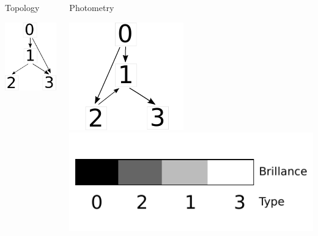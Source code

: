 \begin{frame}
\begin{columns}[c]
			\column{10em}	
				\begin{exampleblock}{Topology}
					\begin{center}
						\includegraphics[trim= 0mm 0mm 0mm 0mm, clip, height=0.6\textwidth]{image/abc_graph_topo.pdf}
					\end{center}
				\end{exampleblock}
			\column{10em}
				\begin{exampleblock}{Photometry}
				\begin{center}
					\includegraphics[trim= 0mm 0mm 0mm 0mm, clip, height=0.6\textwidth]{image/abc_graph_photo.pdf}
					\vspace{1em}
					\includegraphics[trim= 0mm 0mm 17mm 0mm, clip, height=0.3\textwidth]{image/abc_graph_photo_gradient.pdf}
				\end{center}

				\end{exampleblock}
					
		\end{columns}	
	\end{frame}
	
